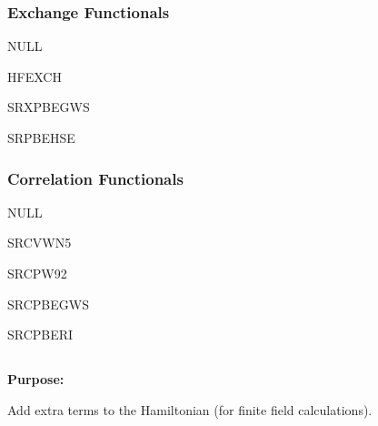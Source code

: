 \subsubsection{Exchange Functionals}
\providecommand\exfn[1]{#1}
\begin{description}

\item{NULL}

\item{HFEXCH}

\item[SRXLDA]

\item{SRXPBEGWS}

\item{SRPBEHSE}

\end{description}

\subsubsection{Correlation Functionals}
\providecommand\corfn[1]{#1}
\begin{description}

\item{NULL}

\item{SRCVWN5}

\item{SRCPW92}

\item{SRCPBEGWS}

\item{SRCPBERI}

\end{description}
 
\pagebreak[3]
\subsection{\label{ref-haminp}}

{\bf Purpose:}

Add extra terms to the Hamiltonian (for finite field calculations).


